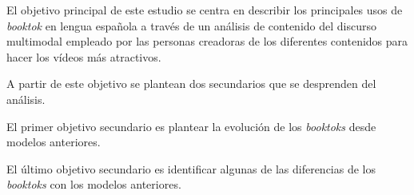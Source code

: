 El objetivo principal de este estudio se centra en describir los
principales usos de \emph{booktok} en lengua española a través de un
análisis de contenido del discurso multimodal \cite{gomez2016}
empleado por las personas creadoras de los diferentes contenidos para
hacer los vídeos más atractivos.

A partir de este objetivo se plantean dos secundarios que se desprenden
del análisis.

El primer objetivo secundario es plantear la evolución de los
\emph{booktoks} desde modelos anteriores.

El último objetivo secundario es identificar algunas de las diferencias
de los \emph{booktoks} con los modelos anteriores.